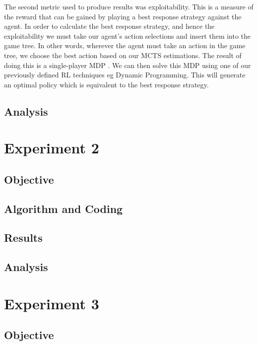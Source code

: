 The second metric used to produce results was exploitability.
This is a measure of the reward that can be gained by playing a best response strategy
against the agent.
In order to calculate the best response strategy, and hence the exploitability we must
take our agent's action selections and insert them into the game tree\citep{heinrich2017reinforcement}.
In other words, wherever the agent must take an action in the game tree, we choose the best action
based on our MCTS estimations.
The result of doing this is a single-player MDP .
We can then solve this MDP using one of our previously defined RL techniques eg Dynamic Programming.
This will generate an optimal policy which is equivalent to the best response strategy.

\subsection{Analysis}\label{subsec:analysis1}


\section{Experiment 2} \label{sec:experiment2}

\subsection{Objective}\label{subsec:objective2}
\subsection{Algorithm and Coding}\label{subsec:algAndCoding2}
\subsection{Results}\label{subsec:results2}
\subsection{Analysis}\label{subsec:analysis2}

\section{Experiment 3}\label{sec:experiment3}

\subsection{Objective}\label{subsec:objective3}
